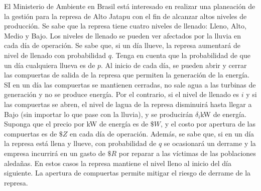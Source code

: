 \noindent El Ministerio de Ambiente en Brasil está interesado en realizar una planeación de la gestión para la represa de Alto Jatapu con el fin de alcanzar altos niveles de producción. Se sabe que la represa tiene cuatro niveles de llenado: Lleno, Alto, Medio y Bajo. Los niveles de llenado se pueden ver afectados por la lluvia en cada día de operación. Se sabe que, si un día llueve, la represa aumentará de nivel de llenado con probabilidad $q$. Tenga en cuenta que la probabilidad de que un día cualquiera llueva es de $p$.
\noindent Al inicio de cada día, se pueden abrir y cerrar las compuertas de salida de la represa que permiten la generación de la energía. SI en un día las compuertas se mantienen cerradas, no sale agua a las turbinas de generación y no se produce energía. Por el contrario, si el nivel de llenado es $i$ y si las compuertas se abren, el nivel de lagua de la represa disminuirá hasta llegar a Bajo (sin importar lo que pase con la lluvia), y se producirán $\delta_{i}$kW de energía.
\noindent Suponga que el precio por kW de energía es de $\$W$, y el costo por apertura de las compuertas es de $\$Z$ en cada día de operación. Además, se sabe que, si en un día la represa está llena y llueve, con probabilidad de $q$ se ocasionará un derrame y la empresa incurrirá en un gasto de $\$R$ por reparar a las víctimas de las poblaciones aledañas. En estos casos la represa mantiene el nivel lleno al inicio del día siguiente. La apertura de compuertas permite mitigar el riesgo de derrame de la represa.

